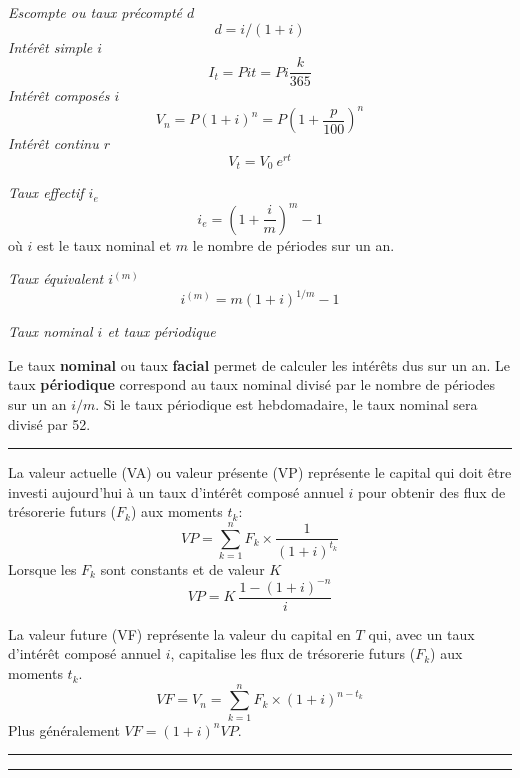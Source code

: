 \begin{f}

\emph{Escompte ou taux précompté \(d\)}
     \[d=i/(1+i)\]
\emph{Intérêt simple \(i\)}
\[
I_t=P i t=P i \frac{k}{365}
\]
\emph{Intérêt composés \(i\)}
\[
V_n=P(1+i)^n=P\left(1+\frac{p}{100}\right)^n
\]
\emph{Intérêt continu \(r\)}
\[V_t=V_0\ e^{rt}\]

\emph{Taux effectif \(i_e\)}
\[
i_e=\left( 1+\frac{i}{m}\right) ^{m}-1
\]
où \(i\) est le taux nominal et \(m\) le nombre de périodes sur un an.

\emph{Taux équivalent \(i^{(m)}\)}
\[
i^{(m)}=m(1+i)^{1 / m}-1
\]

\emph{Taux nominal \(i\) et taux périodique}

Le taux \textbf{nominal} ou taux \textbf{facial} permet de calculer les intérêts dus sur un an.
Le taux \textbf{périodique} correspond au taux nominal divisé par le nombre de périodes sur un an \(i/m\).
Si le taux périodique est hebdomadaire, le taux nominal sera divisé par 52.
\end{f}
\hrule

\begin{f}

La valeur actuelle (VA)  ou valeur présente (VP)  représente le capital qui doit être investi aujourd'hui à un taux d'intérêt composé annuel \(i\) pour obtenir des flux de trésorerie futurs (\(F_k\)) aux moments \(t_k\):
\begin{equation}
	VP = \sum_{k=1}^{n} F_k \times \frac{1}{(1+i)^{t_k}}
\label{ValeurActuelle}
\end{equation}
Lorsque les \(F_k\) sont constants et de valeur \(K\)
\begin{equation}
	VP = K\   \frac{1 - (1+i)^{-n}} {i}
\label{ValeurActuelleFluxCt}
\end{equation}

La valeur future (VF) représente la valeur du capital en \(T\) qui, avec un taux d'intérêt composé annuel \(i\),  capitalise les flux de trésorerie futurs (\(F_k\)) aux moments \(t_k\).
\begin{equation}
	VF=V_n = \sum_{k=1}^{n} F_k \times (1+i)^{n-t_k}
\end{equation}
Plus généralement \(VF= (1+i)^{n}VP\).
\end{f}
\hrule

\begin{f}[Annuités]

\end{f}
\hrule

